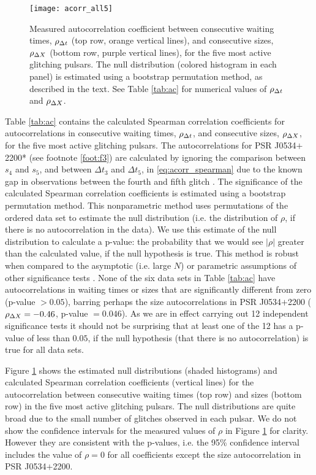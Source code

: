 \begin{figure*}
	\centering %
	\texttt{[image: acorr\_all5]}
	\caption{Measured autocorrelation coefficient between consecutive waiting times, $\rho_{\Delta t}$ (top row, orange vertical lines), and consecutive sizes, $\rho_{\Delta X}$ (bottom row, purple vertical lines), for the five most active glitching pulsars. The null distribution (colored histogram in each panel) is estimated using a bootstrap permutation method, as described in the text. See Table \ref{tab:ac} for numerical values of $\rho_{\Delta t}$ and $\rho_{\Delta X}$.}
	\label{fig:acorr_all5_plot}
\end{figure*}

Table \ref{tab:ac} contains the calculated Spearman correlation coefficients for autocorrelations in consecutive waiting times, $\rho_{\Delta t}$, and consecutive sizes, $\rho_{\Delta X}$, for the five most active glitching pulsars. The autocorrelations for PSR J0534$+$2200* (see footnote \ref{foot:f3}) are calculated by ignoring the comparison between $s_4$ and $s_5$, and between $\Delta t_3$ and $\Delta t_5$, in \eqref{eq:acorr_spearman} due to the known gap in observations between the fourth and fifth glitch \citep{Lyne2015}. The significance of the calculated Spearman correlation coefficients is estimated using a bootstrap permutation method. This nonparametric method uses permutations of the ordered data set to estimate the null distribution (i.e. the distribution of $\rho$, if there is no autocorrelation in the data). We use this estimate of the null distribution to calculate a p-value: the probability that we would see $|\rho|$ greater than the calculated value, if the null hypothesis is true. This method is robust when compared to the asymptotic (i.e. large $N$) or parametric assumptions of other significance tests \citep{Hall1992, Good2005}. None of the six data sets in Table \ref{tab:ac} have autocorrelations in waiting times or sizes that are significantly different from zero (p-value $> 0.05$), barring perhaps the size autocorrelations in PSR J0534$+$2200 ($\rho_{\Delta X}=-0.46$, p-value $=0.046$). As we are in effect carrying out 12 independent significance tests it should not be surprising that at least one of the 12 has a p-value of less than $0.05$, if the null hypothesis (that there is no autocorrelation) is true for all data sets. 

Figure \ref{fig:acorr_all5_plot} shows the estimated null distributions (shaded histograms) and calculated Spearman correlation coefficients (vertical lines) for the autocorrelation between consecutive waiting times (top row) and sizes (bottom row) in the five most active glitching pulsars. The null distributions are quite broad due to the small number of glitches observed in each pulsar. We do not show the confidence intervals for the measured values of $\rho$ in Figure \ref{fig:acorr_all5_plot} for clarity. However they are consistent with the p-values, i.e. the 95\% confidence interval includes the value of $\rho=0$ for all coefficients except the size autocorrelation in PSR J0534$+$2200. 

